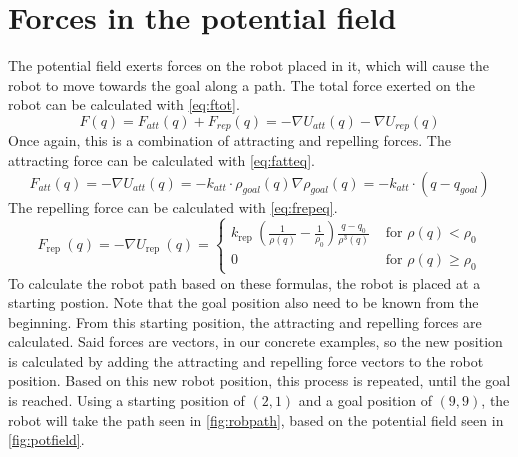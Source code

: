 \documentclass[11pt]{article}
\begin{document}
    \section{Forces in the potential field}\label{sec:forcesinfield}
    The potential field exerts forces on the robot placed in it, which will cause the robot to move towards the goal along a path.
    The total force exerted on the robot can be calculated with \autoref{eq:ftot}.
    \begin{equation}\label{eq:ftot}
        F(q)=F_{a t t}(q)+F_{r e p}(q)=-\nabla U_{a t t}(q)-\nabla U_{r e p}(q)
    \end{equation}
    Once again, this is a combination of attracting and repelling forces.
    The attracting force can be calculated with \autoref{eq:fatteq}.
    \begin{equation}\label{eq:fatteq}
        F_{a t t}(q)=-\nabla U_{a t t}(q)=-k_{a t t} \cdot \rho_{g o a l}(q) \nabla \rho_{g o a l}(q)=-k_{a t t} \cdot\left(q-q_{g o a l}\right)
    \end{equation}
    The repelling force can be calculated with \autoref{eq:frepeq}.
    \begin{equation}\label{eq:frepeq}
        F_{\text {rep }}(q)=-\nabla U_{\text {rep }}(q)=\left\{\begin{array}{ll}
                                                                   k_{\text {rep }}\left(\frac{1}{\rho(q)}-\frac{1}{\rho_{0}}\right) \frac{q-q_{0}}{\rho^{3}(q)} & \text { for } \rho(q)<\rho_{0} \\
                                                                   0 & \text { for } \rho(q) \geq \rho_{0}
        \end{array}\right.
    \end{equation}
    To calculate the robot path based on these formulas, the robot is placed at a starting postion.
    Note that the goal position also need to be known from the beginning.
    From this starting position, the attracting and repelling forces are calculated.
    Said forces are vectors, in our concrete examples, so the new position is calculated by adding the attracting and repelling force vectors to the robot position.
    Based on this new robot position, this process is repeated, until the goal is reached.
    Using a starting position of $\left( 2, 1 \right)$ and a goal position of $\left( 9, 9 \right)$, the robot will take the path seen in \autoref{fig:robpath}, based on the potential field seen in \autoref{fig:potfield}.
\end{document}
